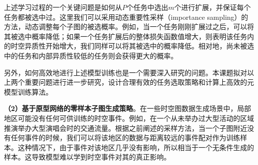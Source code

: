 \documentclass[12pt,UTF8,AutoFakeBold=2,a4paper]{ctexart} %
\begin{document}
上述学习过程的一个关键问题是如何从$P$个任务中选出$m$个进行扩展，并保证每个任务都被选中过。这里我们可以采用动态重要性采样（importance sampling）的方法，动态调整每个子图的被选概率。例如，当一个任务刚刚扩展过之后，可以将其被选中概率降低；如果一个任务扩展后的整体损失函数值增大，则表明该任务内的时空异质性开始增大，我们同样可以将其被选中的概率降低。相对地，尚未被选中的任务和内部异质性较低的任务则会获得更大的概率。

另外，如何高效地进行上述模型训练也是一个需要深入研究的问题。本课题拟对以上两个重要问题进行进一步研究，设计合理有效的任务选取策略和计算上高效的元模型训练算法。

\textbf{（2）基于原型网络的零样本子图生成策略}。在一些时空图数据生成场景中，局部地区可能没有任何可供训练的时空事件。例如，在一个从未举办过大型活动的区域推演举办大型演唱会时的交通流量。根据之前阐述的采样方法，当一个子图附近没有任何事件的时候，我们可以将该地区的数据与距离较远的事件配对作为训练样本。这种情况下，由于事件对该地区几乎没有影响，所以相当于一个无条件生成的样本。这导致模型难以学到时空事件对其的真正影响。
\end{document}
